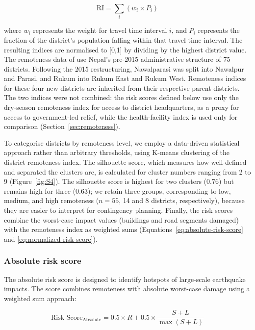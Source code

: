 \documentclass[preprint,12pt,authoryear]{elsarticle}
\begin{document}
\begin{equation}
\label{eq:remoteness-index}
\text{RI} = \sum_{i} \left( w_{i} \times P_{i} \right)
\end{equation}

where $w_{i}$ represents the weight for travel time interval $i$, and $P_{i}$ represents the fraction of the district's population falling within that travel time interval. The resulting indices are normalised to [0,1] by dividing by the highest district value. The remoteness data of \cite{banick2019} use Nepal's pre-2015 administrative structure of 75 districts. Following the 2015 restructuring, Nawalparasi was split into Nawalpur and Parasi, and Rukum into Rukum East and Rukum West. Remoteness indices for these four new districts are inherited from their respective parent districts. The two indices were not combined: the risk scores defined below use only the dry-season remoteness index for access to district headquarters, as a proxy for access to government-led relief, while the health-facility index is used only for comparison (Section~\ref{sec:remoteness}).

To categorise districts by remoteness level, we employ a data-driven statistical approach rather than arbitrary thresholds, using K-means clustering of the district remoteness index. The silhouette score, which measures how well-defined and separated the clusters are, is calculated for cluster numbers ranging from 2 to 9 (Figure~\ref{fig:S4}). The silhouette score is highest for two clusters (0.76) but remains high for three (0.63); we retain three groups, corresponding to low, medium, and high remoteness ($n = 55$, 14 and 8 districts, respectively), because they are easier to interpret for contingency planning. Finally, the risk scores combine the worst-case impact values (buildings and road segments damaged) with the remoteness index as weighted sums (Equations~\ref{eq:absolute-risk-score} and \ref{eq:normalized-risk-score}).

\subsubsection{Absolute risk score}

The absolute risk score is designed to identify hotspots of large-scale earthquake impacts. The score combines remoteness with absolute worst-case damage using a weighted sum approach:

\begin{equation}
\label{eq:absolute-risk-score}
\text{Risk Score}_{\text{Absolute}} = 0.5 \times R + 0.5 \times \frac{S + L}{\max(S + L)}
\end{equation}
\end{document}
